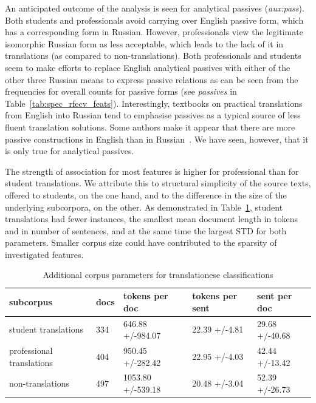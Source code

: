 An anticipated outcome of the analysis is seen for analytical passives (\textit{aux:pass}). Both students and professionals avoid carrying over English passive form, which has a corresponding form in Russian. However, professionals view the legitimate isomorphic Russian form as less acceptable, which leads to the lack of it in translations (as compared to non-translations). Both professionals and students seem to make efforts to replace English analytical passives with either of the other three Russian means to express passive relations as can be seen from the frequencies for overall counts for passive forms (see \textit{passives} in Table~\ref{tab:spec_rfecv_feats}). Interestingly, textbooks on practical translations from English into Russian tend to emphasise passives as a typical source of less fluent translation solutions. Some authors make it appear that there are more passive constructions in English than in Russian~\cite[see, for example,][]{Zrazhevskaya1972, Belyaev2010, Borisova2019}. We have seen, however, that it is only true for analytical passives.

The strength of association for most features is higher for professional than for student translations. We attribute this to structural simplicity of the source texts, offered to students, on the one hand, and to the difference in the size of the underlying subcorpora, on the other. As demonstrated in Table~\ref{tab:corpus_means}, student translations had fewer instances, the smallest mean document length in tokens and in number of sentences, and at the same time the largest STD for both parameters. Smaller corpus size could have contributed to the sparsity of investigated features.

\begin{table}[H]
	\begin{tabular}{l|llll}
			\toprule
			subcorpus                 & docs & tokens per doc   & tokens per sent & sent per doc  \\
			\midrule
			student translations      & 334  & 646.88 +/-984.07  & 22.39 +/-4.81    & 29.68 +/-40.68 \\
			professional translations & 404  & 950.45 +/-282.42  & 22.95 +/-4.03    & 42.44 +/-13.42 \\
			non-translations          & 497  & 1053.80 +/-539.18 & 20.48 +/-3.04    & 52.39 +/-26.73 \\
			\bottomrule
		\end{tabular}
 \caption{\label{tab:corpus_means}Additional corpus parameters for translationese classifications}
\end{table}

